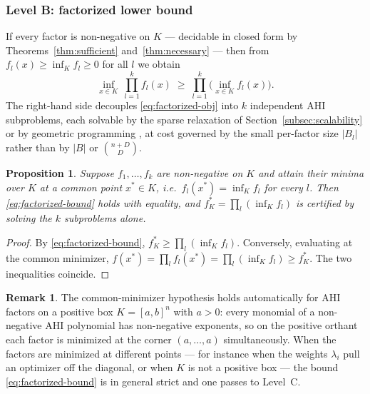 \documentclass[12pt]{elsarticle}
\newtheorem{proposition}[theorem]{Proposition}
\theoremstyle{definition}
\newtheorem{remark}[theorem]{Remark}
\begin{document}
\subsubsection{Level B: factorized lower bound}\label{subsubsec:levelB}

If every factor is non-negative on $K$ --- decidable in closed form by Theorems~\ref{thm:sufficient} and~\ref{thm:necessary} --- then from $f_l(x) \ge \inf_{K} f_l \ge 0$ for all $l$ we obtain
\begin{equation}\label{eq:factorized-bound}
\inf_{x\in K}\ \prod_{l=1}^{k} f_l(x)
\;\ge\;
\prod_{l=1}^{k}\Big(\inf_{x\in K} f_l(x)\Big).
\end{equation}
The right-hand side decouples \eqref{eq:factorized-obj} into $k$ independent AHI subproblems, each solvable by the sparse relaxation of Section~\ref{subsec:scalability} or by geometric programming \citep{iliman2016lower}, at cost governed by the small per-factor size $|B_l|$ rather than by $|B|$ or $\binom{n+D}{D}$.

\begin{proposition}\label{prop:factorized-exact}
Suppose $f_1,\dots,f_k$ are non-negative on $K$ and attain their minima over $K$ at a common point $x^{*}\in K$, i.e.\ $f_l(x^{*}) = \inf_K f_l$ for every $l$. Then \eqref{eq:factorized-bound} holds with equality, and $f^{*}_{K} = \prod_l (\inf_K f_l)$ is certified by solving the $k$ subproblems alone.
\end{proposition}

\begin{proof}
By \eqref{eq:factorized-bound}, $f^{*}_K \ge \prod_l(\inf_K f_l)$. Conversely, evaluating at the common minimizer, $f(x^{*}) = \prod_l f_l(x^{*}) = \prod_l (\inf_K f_l) \ge f^{*}_K$. The two inequalities coincide.
\end{proof}

\begin{remark}\label{rem:common-min}
The common-minimizer hypothesis holds automatically for AHI factors on a positive box $K=[a,b]^{n}$ with $a>0$: every monomial of a non-negative AHI polynomial has non-negative exponents, so on the positive orthant each factor is minimized at the corner $(a,\dots,a)$ simultaneously. When the factors are minimized at different points --- for instance when the weights $\lambda_i$ pull an optimizer off the diagonal, or when $K$ is not a positive box --- the bound \eqref{eq:factorized-bound} is in general strict and one passes to Level~C.
\end{remark}
\end{document}
